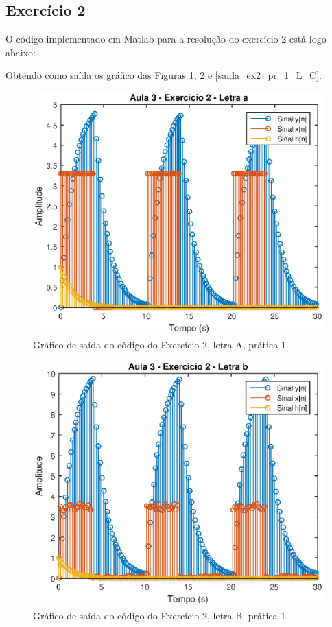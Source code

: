 \subsection{Exercício 2}
O código implementado em Matlab para a resolução do exercício 2 está logo abaixo:


Obtendo como saída os gráfico das Figuras \ref{saida_ex2_pr_1_L_A}, \ref{saida_ex2_pr_1_L_B} e \ref{saida_ex2_pr_1_L_C}.

\begin{figure}[!ht]
	\centering
    \includegraphics[scale = 1]{Imagens/Aula_3_exercicio2_LetraA.eps}
    \caption{Gráfico de saída do código do Exercício 2, letra A, prática 1.}
    \label{saida_ex2_pr_1_L_A}
\end{figure}

\begin{figure}[!ht]
	\centering
    \includegraphics[scale = 1]{Imagens/Aula_3_exercicio2_LetraB.eps}
    \caption{Gráfico de saída do código do Exercício 2, letra B, prática 1.}
    \label{saida_ex2_pr_1_L_B}
\end{figure}

